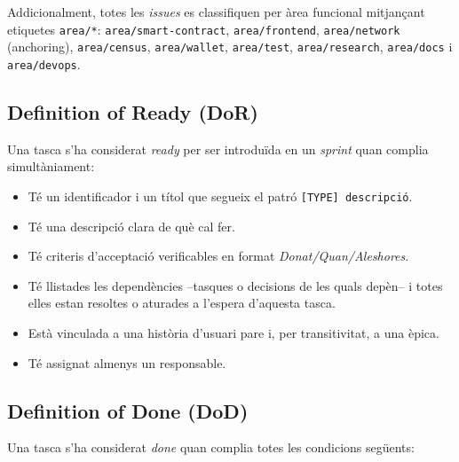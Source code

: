 Addicionalment, totes les \emph{issues} es classifiquen per àrea funcional
mitjançant etiquetes \texttt{area/*}: \texttt{area/smart-contract},
\texttt{area/frontend}, \texttt{area/network} (anchoring), \texttt{area/census},
\texttt{area/wallet}, \texttt{area/test}, \texttt{area/research},
\texttt{area/docs} i \texttt{area/devops}.

\subsection{Definition of Ready (\acs{DoR})}
\label{sec:dor}

Una tasca s'ha considerat \emph{ready} per ser introduïda en un \emph{sprint}
quan complia simultàniament:

\begin{itemize}
    \item Té un identificador i un títol que segueix el patró
    \texttt{[TYPE] descripció}.
    \item Té una descripció clara de què cal fer.
    \item Té criteris d'acceptació verificables en format
    \emph{Donat/Quan/Aleshores}.
    \item Té llistades les dependències --tasques o decisions de les quals
    depèn-- i totes elles estan resoltes o aturades a l'espera d'aquesta tasca.
    \item Està vinculada a una història d'usuari pare i, per transitivitat, a
    una èpica.
    \item Té assignat almenys un responsable.
\end{itemize}

\subsection{Definition of Done (\acs{DoD})}
\label{sec:dod}

Una tasca s'ha considerat \emph{done} quan complia totes les condicions
següents:

